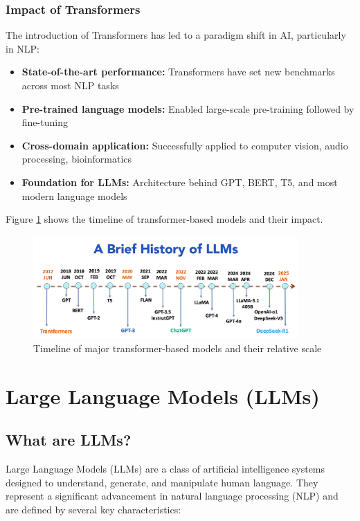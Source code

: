 \documentclass[11pt,a4paper]{report}
\begin{document}
\subsection{Impact of Transformers}
The introduction of Transformers has led to a paradigm shift in AI, particularly in NLP:

\begin{itemize}
    \item \textbf{State-of-the-art performance:} Transformers have set new benchmarks across most NLP tasks
    \item \textbf{Pre-trained language models:} Enabled large-scale pre-training followed by fine-tuning
    \item \textbf{Cross-domain application:} Successfully applied to computer vision, audio processing, bioinformatics
    \item \textbf{Foundation for LLMs:} Architecture behind GPT, BERT, T5, and most modern language models
\end{itemize}

Figure \ref{fig:transformer-impact} shows the timeline of transformer-based models and their impact.

\begin{figure}[ht]
    \centering
    \includegraphics[width=0.9\textwidth]{transformer_models_timeline.png}
    \caption{Timeline of major transformer-based models and their relative scale}
    \label{fig:transformer-impact}
\end{figure}

\chapter{Large Language Models (LLMs)}
\section{What are LLMs?}

Large Language Models (LLMs) are a class of artificial intelligence systems designed to understand, generate, and manipulate human language. They represent a significant advancement in natural language processing (NLP) and are defined by several key characteristics:
\end{document}
